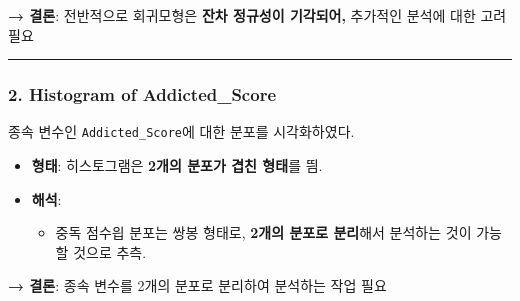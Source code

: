 \documentclass[11pt]{article}
\providecommand{\tightlist}{%
      \setlength{\itemsep}{0pt}\setlength{\parskip}{0pt}}
\begin{document}
\textbf{→ 결론}: 전반적으로 회귀모형은 \textbf{잔차 정규성이 기각되어,}
추가적인 분석에 대한 고려 필요

\begin{center}\rule{0.5\linewidth}{0.5pt}\end{center}

\subsubsection{2. Histogram of
Addicted\_Score}\label{histogram-of-addicted_score}

종속 변수인 \texttt{Addicted\_Score}에 대한 분포를 시각화하였다.

\begin{itemize}
\tightlist
\item
  \textbf{형태}: 히스토그램은 \textbf{2개의 분포가 겹친 형태}를 띔.
\item
  \textbf{해석}:

  \begin{itemize}
  \tightlist
  \item
    중독 점수읩 분포는 쌍봉 형태로, \textbf{2개의 분포로 분리}해서
    분석하는 것이 가능할 것으로 추측.
  \end{itemize}
\end{itemize}

\textbf{→ 결론}: 종속 변수를 2개의 분포로 분리하여 분석하는 작업 필요
\end{document}
